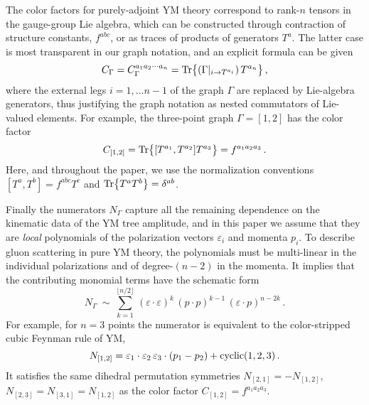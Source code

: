 \documentclass[11pt,a4paper]{article}
\begin{document}
The color factors for purely-adjoint YM theory correspond to rank-$n$ tensors in the gauge-group Lie algebra, which can be constructed through contraction of structure constants, $f^{abc}$, or as traces of products of generators $T^a$. The latter case is most transparent in our graph notation, and an explicit formula can be given
\begin{equation}
C_{\Gamma}= C_{\Gamma}^{a_1 a_2 \cdots a_n}= {\rm Tr} \big\{(\Gamma |_{i\rightarrow T^{a_i}})  \, T^{a_n}  \big\} \,,
\end{equation}
where the external legs $i=1,\ldots n-1$ of the graph $\Gamma$ are replaced by Lie-algebra generators, thus justifying the graph notation as nested commutators of Lie-valued elements. For example, the three-point graph $\Gamma=[1,2]$ has the color factor
\begin{equation}
C_{[1,2]} = {\rm Tr} \big\{[T^{a_1},T^{a_2}] T^{a_3}\big\} = f^{a_1 a_2 a_3}\,.
\end{equation}
Here, and throughout the paper, we use the normalization conventions $[T^{a},T^{b}]= f^{abc} T^{c}$ and ${\rm Tr} \big\{ T^{a} T^{b}\big\}= \delta^{ab}$.

Finally the numerators $N_{\Gamma}$ capture all the remaining dependence on the kinematic data of the YM tree amplitude, and in this paper we assume that they are {\it local} polynomials of the polarization vectors $\varepsilon_i$ and momenta $p_i$. To describe gluon scattering in pure YM theory, the polynomials must be multi-linear in the individual polarizations and of degree-$(n-2)$ in the momenta. It implies that the contributing monomial terms have the schematic form 
\begin{equation} \label{NumeratorStructure}
N_{\Gamma}  ~ \sim ~ \sum_{k=1}^{\lfloor n/2 \rfloor} \,(\varepsilon  \cdot\varepsilon)^{k}\,(p \cdot p )^{k-1} \, (\varepsilon \cdot p )^{n-2k}\,.
\end{equation}
For example, for $n=3$ points the numerator is equivalent to the color-stripped cubic Feynman rule of YM,
\begin{equation}
N_{[1,2]} = \varepsilon_1  \cdot\varepsilon_2\,  \varepsilon_3  \cdot (p_1-p_2) + {\rm cyclic}(1,2,3)\,.
\end{equation}
It satisfies the same dihedral permutation symmetries $N_{[2,1]}=-N_{[1,2]}$, $N_{[2,3]}=N_{[3,1]}=N_{[1,2]}$ as the color factor $C_{[1,2]}=f^{a_1 a_2 a_3}$. 
\end{document}
